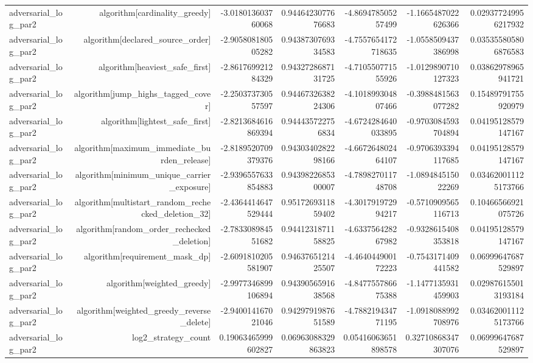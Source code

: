 {\begin{longtable}{lrrrrrr}
adversarial\_log\_par2 & algorithm[cardinality\_greedy] & -3.018013603760068 & 0.9446423077676683 & -4.869478505257499 & -1.1665487022626366 & 0.029377249956217932 \\
adversarial\_log\_par2 & algorithm[declared\_source\_order] & -2.905808180505282 & 0.9438730769334583 & -4.7557654172718635 & -1.0558509437386998 & 0.035355805806876583 \\
adversarial\_log\_par2 & algorithm[heaviest\_safe\_first] & -2.861769921284329 & 0.9432728687131725 & -4.710550771555926 & -1.0129890710127323 & 0.03862978965941721 \\
adversarial\_log\_par2 & algorithm[jump\_highs\_tagged\_cover] & -2.250373730557597 & 0.9446732638224306 & -4.101899304807466 & -0.3988481563077282 & 0.15489791755920979 \\
adversarial\_log\_par2 & algorithm[lightest\_safe\_first] & -2.8213684616869394 & 0.944435722756834 & -4.6724284640033895 & -0.9703084593704894 & 0.04195128579147167 \\
adversarial\_log\_par2 & algorithm[maximum\_immediate\_burden\_release] & -2.8189520709379376 & 0.9430340282298166 & -4.667264802464107 & -0.9706393394117685 & 0.04195128579147167 \\
adversarial\_log\_par2 & algorithm[minimum\_unique\_carrier\_exposure] & -2.9396557633854883 & 0.9439822685300007 & -4.789827011748708 & -1.089484515022269 & 0.034620011125173766 \\
adversarial\_log\_par2 & algorithm[multistart\_random\_rechecked\_deletion\_32] & -2.4364414647529444 & 0.9517269311859402 & -4.301791972994217 & -0.5710909565116713 & 0.10466566921075726 \\
adversarial\_log\_par2 & algorithm[random\_order\_rechecked\_deletion] & -2.783308984551682 & 0.9441231871158825 & -4.633756428267982 & -0.9328615408353818 & 0.04195128579147167 \\
adversarial\_log\_par2 & algorithm[requirement\_mask\_dp] & -2.6091810205581907 & 0.9463765121425507 & -4.464044900172223 & -0.7543171409441582 & 0.06999647687529897 \\
adversarial\_log\_par2 & algorithm[weighted\_greedy] & -2.9977346899106894 & 0.9439056591638568 & -4.847755786675388 & -1.1477135931459903 & 0.029876155013193184 \\
adversarial\_log\_par2 & algorithm[weighted\_greedy\_reverse\_delete] & -2.940014167021046 & 0.9429791987651589 & -4.788219434771195 & -1.0918088992708976 & 0.034620011125173766 \\
adversarial\_log\_par2 & log2\_strategy\_count & 0.19063465999602827 & 0.06963088329863823 & 0.05416063651898578 & 0.32710868347307076 & 0.06999647687529897 \\

\end{longtable}}
